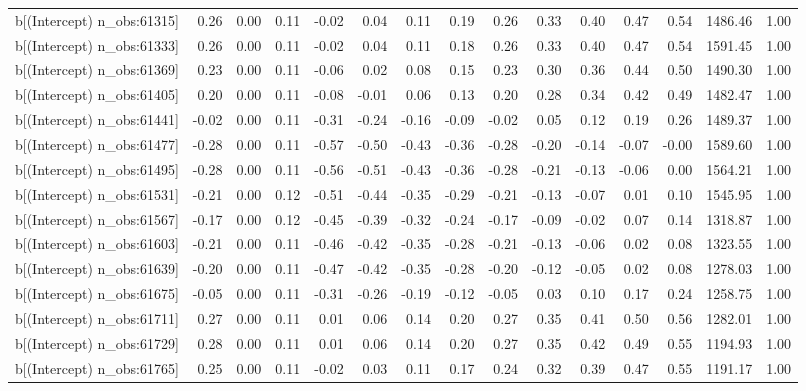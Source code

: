 \begin{table}[ht]
\begin{tabular}{rrrrrrrrrrrrrrr}
  b[(Intercept) n\_obs:61315] & 0.26 & 0.00 & 0.11 & -0.02 & 0.04 & 0.11 & 0.19 & 0.26 & 0.33 & 0.40 & 0.47 & 0.54 & 1486.46 & 1.00 \\ 
  b[(Intercept) n\_obs:61333] & 0.26 & 0.00 & 0.11 & -0.02 & 0.04 & 0.11 & 0.18 & 0.26 & 0.33 & 0.40 & 0.47 & 0.54 & 1591.45 & 1.00 \\ 
  b[(Intercept) n\_obs:61369] & 0.23 & 0.00 & 0.11 & -0.06 & 0.02 & 0.08 & 0.15 & 0.23 & 0.30 & 0.36 & 0.44 & 0.50 & 1490.30 & 1.00 \\ 
  b[(Intercept) n\_obs:61405] & 0.20 & 0.00 & 0.11 & -0.08 & -0.01 & 0.06 & 0.13 & 0.20 & 0.28 & 0.34 & 0.42 & 0.49 & 1482.47 & 1.00 \\ 
  b[(Intercept) n\_obs:61441] & -0.02 & 0.00 & 0.11 & -0.31 & -0.24 & -0.16 & -0.09 & -0.02 & 0.05 & 0.12 & 0.19 & 0.26 & 1489.37 & 1.00 \\ 
  b[(Intercept) n\_obs:61477] & -0.28 & 0.00 & 0.11 & -0.57 & -0.50 & -0.43 & -0.36 & -0.28 & -0.20 & -0.14 & -0.07 & -0.00 & 1589.60 & 1.00 \\ 
  b[(Intercept) n\_obs:61495] & -0.28 & 0.00 & 0.11 & -0.56 & -0.51 & -0.43 & -0.36 & -0.28 & -0.21 & -0.13 & -0.06 & 0.00 & 1564.21 & 1.00 \\ 
  b[(Intercept) n\_obs:61531] & -0.21 & 0.00 & 0.12 & -0.51 & -0.44 & -0.35 & -0.29 & -0.21 & -0.13 & -0.07 & 0.01 & 0.10 & 1545.95 & 1.00 \\ 
  b[(Intercept) n\_obs:61567] & -0.17 & 0.00 & 0.12 & -0.45 & -0.39 & -0.32 & -0.24 & -0.17 & -0.09 & -0.02 & 0.07 & 0.14 & 1318.87 & 1.00 \\ 
  b[(Intercept) n\_obs:61603] & -0.21 & 0.00 & 0.11 & -0.46 & -0.42 & -0.35 & -0.28 & -0.21 & -0.13 & -0.06 & 0.02 & 0.08 & 1323.55 & 1.00 \\ 
  b[(Intercept) n\_obs:61639] & -0.20 & 0.00 & 0.11 & -0.47 & -0.42 & -0.35 & -0.28 & -0.20 & -0.12 & -0.05 & 0.02 & 0.08 & 1278.03 & 1.00 \\ 
  b[(Intercept) n\_obs:61675] & -0.05 & 0.00 & 0.11 & -0.31 & -0.26 & -0.19 & -0.12 & -0.05 & 0.03 & 0.10 & 0.17 & 0.24 & 1258.75 & 1.00 \\ 
  b[(Intercept) n\_obs:61711] & 0.27 & 0.00 & 0.11 & 0.01 & 0.06 & 0.14 & 0.20 & 0.27 & 0.35 & 0.41 & 0.50 & 0.56 & 1282.01 & 1.00 \\ 
  b[(Intercept) n\_obs:61729] & 0.28 & 0.00 & 0.11 & 0.01 & 0.06 & 0.14 & 0.20 & 0.27 & 0.35 & 0.42 & 0.49 & 0.55 & 1194.93 & 1.00 \\ 
  b[(Intercept) n\_obs:61765] & 0.25 & 0.00 & 0.11 & -0.02 & 0.03 & 0.11 & 0.17 & 0.24 & 0.32 & 0.39 & 0.47 & 0.55 & 1191.17 & 1.00 \\ 

\end{tabular}
\end{table}
